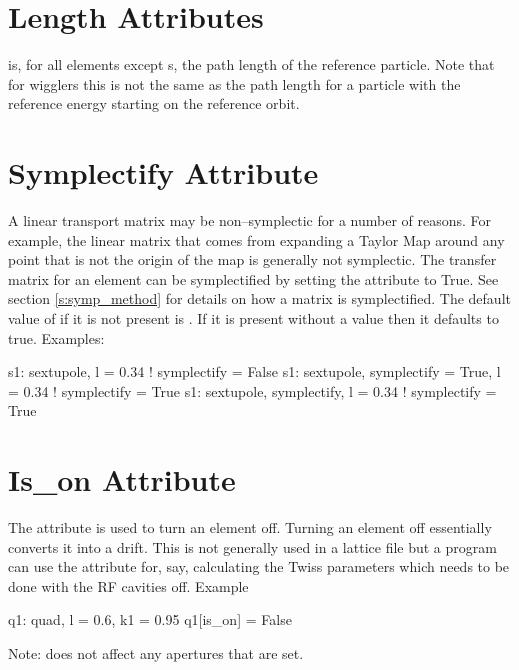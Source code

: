 \section{Length Attributes}
\label{s:l}

 is, for all elements except s, the path length 
of the reference particle.
Note that for wigglers this is not the same as the path length for
a particle with the reference energy starting on the reference orbit.

\section{Symplectify Attribute}
\label{s:symp}

A linear transport matrix may be non--symplectic for a number of reasons.
For example, the linear matrix that comes from expanding a Taylor Map
around any point that is not the origin of the map is generally not 
symplectic. The transfer matrix for an element can be symplectified by
setting the  attribute to True. See section \ref{s:symp_method}
for details on how a matrix is symplectified. The default value of  
if it is not present is . If it is present without a value then
it defaults to true. Examples:
\begin{example}
  s1: sextupole, l = 0.34                       ! symplectify = False
  s1: sextupole, symplectify = True, l = 0.34   ! symplectify = True
  s1: sextupole, symplectify, l = 0.34          ! symplectify = True
\end{example}

\section{Is\_on Attribute}
\label{s:is_on}

The  attribute is used to turn an element off. Turning
an element off essentially converts it into a drift. This is not
generally used in a lattice file but a program can use the attribute
for, say, calculating the Twiss parameters which needs to be done
with the RF cavities off. Example
\begin{example}
  q1: quad, l = 0.6, k1 = 0.95
  q1[is_on] = False
\end{example}
Note:  does not affect any apertures that are set.